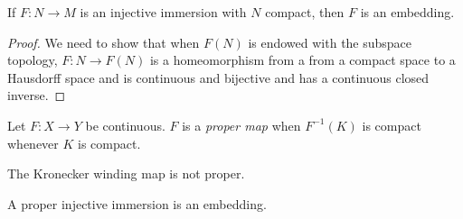 \begin{prop}
If $F: N \to M$ is an injective immersion with $N$ compact, then $F$
is an embedding.
\end{prop}
\begin{proof}
We need to show that when $F(N)$ is endowed with the subspace topology,
$F: N \to F(N)$ is a homeomorphism from a from a compact space to a
Hausdorff space and is continuous and bijective and has a continuous
closed inverse.
\end{proof}

\begin{defn}
Let $F: X \to Y$ be continuous. $F$ is a \emph{proper map} when
$F^{-1}(K)$ is compact whenever $K$ is compact.
\end{defn}

The Kronecker winding map is not proper.

\begin{prop}
A proper injective immersion is an embedding.
\end{prop}

